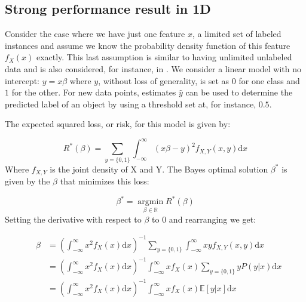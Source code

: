 \documentclass[smallcondensed]{svjour3}
\begin{document}
\subsection{Strong performance result in 1D}
Consider the case where we have just one feature $x$, a limited set of labeled instances and assume we know the probability density function of this feature $f_X(x)$ exactly. This last assumption is similar to having unlimited unlabeled data and is also considered, for instance, in \cite{Sokolovska2008}. We consider a linear model with no intercept: $y = x \beta$ where $y$, without loss of generality, is set as $0$ for one class and $1$ for the other. For new data points, estimates $\hat{y}$ can be used to determine the predicted label of an object by using a threshold set at, for instance, $0.5$.

The expected squared loss, or risk, for this model is given by:

\begin{equation} \label{eq:trueloss}
R^*(\beta) = \sum_{y=\{0,1\}}{ \int_{-\infty}^{\infty}(x \beta - y)^2  f_{X,Y}(x,y)  \mathrm{d}x}
\end{equation}
Where  $f_{X,Y}$ is the joint density of X and Y. The Bayes optimal solution $\beta^*$ is given by the $\beta$ that minimizes this loss:

\begin{equation} \label{eq:bayesoptimal}
\beta^* = \operatorname*{argmin}_{\beta \in \mathbb{R}} R^*(\beta)
\end{equation}
Setting the derivative with respect to $\beta$ to $0$ and rearranging we get:

\begin{eqnarray}
&\beta & = \left( \int_{-\infty}^{\infty} { x^2 f_X(x) \mathrm{d}x} \right)^{-1} \sum_{y=\{0,1\}} \int_{-\infty}^{\infty} { x y f_{X,Y}(x,y) \mathrm{d}x } \\
& & =    \left( \int_{-\infty}^{\infty} { x^2 f_X(x) \mathrm{d}x} \right)^{-1}  \int_{-\infty}^{\infty} { x f_X(x) \sum_{y=\{0,1\}} y P(y|x) \mathrm{d}x} \\
& & =   \left( \int_{-\infty}^{\infty} { x^2 f_X(x) \mathrm{d}x} \right)^{-1}  \int_{-\infty}^{\infty} { x f_X(x) \mathbb{E}[y|x] \mathrm{d}x} \label{eqn:sslsolution}
\end{eqnarray}
\end{document}
